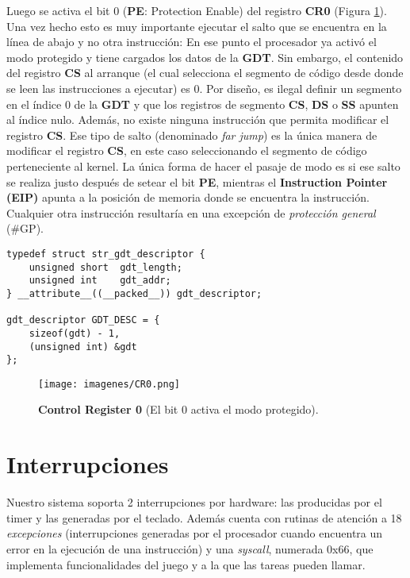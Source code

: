 \documentclass[a4paper]{article}
\begin{document}
Luego se activa el bit 0 (\textbf{PE}: Protection Enable) del registro \textbf{CR0} (Figura \ref{cr0}). Una vez hecho esto es muy importante ejecutar el salto que se encuentra en la línea de abajo y no otra instrucción: En ese punto el procesador ya activó el modo protegido y tiene cargados los datos de la \textbf{GDT}. Sin embargo, el contenido del registro \textbf{CS} al arranque (el cual selecciona el segmento de código desde donde se leen las instrucciones a ejecutar) es 0. Por diseño, es ilegal definir un segmento en el índice 0 de la \textbf{GDT} y que los registros de segmento \textbf{CS}, \textbf{DS} o \textbf{SS} apunten al índice nulo. Además, no existe ninguna instrucción que permita modificar el registro \textbf{CS}. Ese tipo de salto (denominado \textit{far jump}) es la única manera de modificar el registro \textbf{CS}, en este caso seleccionando el segmento de código perteneciente al kernel. La única forma de hacer el pasaje de modo es si ese salto se realiza justo después de setear el bit \textbf{PE}, mientras el \textbf{Instruction Pointer (EIP)} apunta a la posición de memoria donde se encuentra la instrucción. Cualquier otra instrucción resultaría en una excepción de \textit{protección general} (\#GP).

\begin{lstlisting}[caption={Descriptor de GDT -- \textbf{gdt.\{c,h\}}}, label=gdtDesc]
typedef struct str_gdt_descriptor {
    unsigned short  gdt_length;
    unsigned int    gdt_addr;
} __attribute__((__packed__)) gdt_descriptor;

gdt_descriptor GDT_DESC = {
    sizeof(gdt) - 1,
    (unsigned int) &gdt
};
\end{lstlisting}

\begin{figure}
  \begin{center}
	\texttt{[image: imagenes/CR0.png]}
	\caption{\textbf{Control Register 0} (El bit 0 activa el modo protegido).}
	\label{cr0}
  \end{center}
\end{figure}

\section{Interrupciones}
Nuestro sistema soporta 2 interrupciones por hardware: las producidas por el timer y las generadas por el teclado. Además cuenta con rutinas de atención a 18 \textit{excepciones} (interrupciones generadas por el procesador cuando encuentra un error en la ejecución de una instrucción) y una \textit{syscall}, numerada 0x66, que implementa funcionalidades del juego y a la que las tareas pueden llamar.
\end{document}
